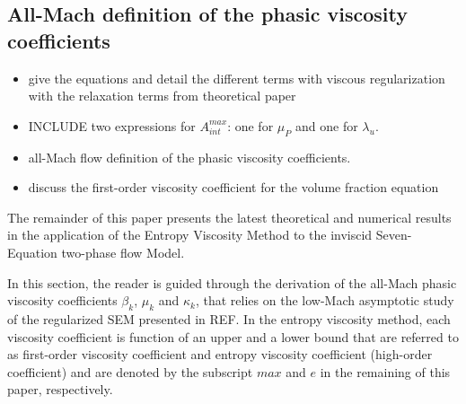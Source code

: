 \documentclass[preprint,10pt]{elsarticle}
\begin{document}
\subsection{All-Mach definition of the phasic viscosity coefficients}\label{sec:visc-def}
%

\begin{itemize}
\item give the equations and detail the different terms with viscous regularization with the relaxation terms from theoretical paper 
\item INCLUDE two expressions for $A_{int}^{max}$: one for $\mu_P$ and one for $\lambda_u$. 
\item all-Mach flow definition of the phasic viscosity coefficients.
\item discuss the first-order viscosity coefficient for the volume fraction equation
\end{itemize}
%
The remainder of this paper presents the latest theoretical and numerical results in the application of the Entropy Viscosity Method to the inviscid Seven-Equation two-phase flow Model. 

In this section, the reader is guided through the derivation of the all-Mach phasic viscosity coefficients $\beta_k$, $\mu_k$ and $\kappa_k$, that relies on the low-Mach asymptotic study of the regularized SEM presented in REF. In the entropy viscosity method, each viscosity coefficient is function of an upper and a lower bound that are referred to as first-order viscosity coefficient and entropy viscosity coefficient (high-order coefficient) and are denoted by the subscript $max$ and $e$ in the remaining of this paper, respectively. 
%
\end{document}

